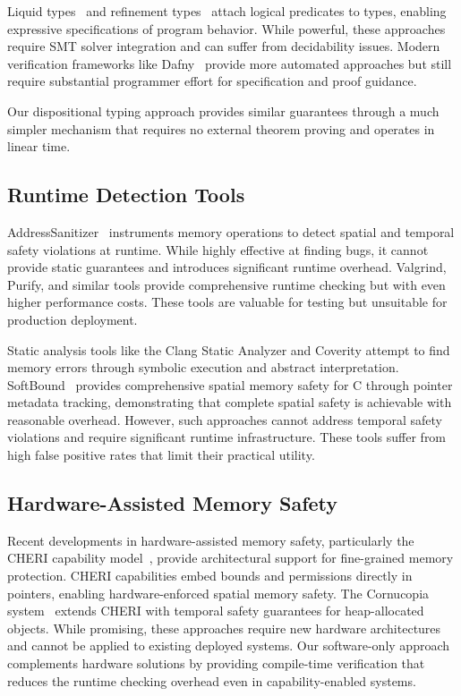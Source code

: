\documentclass[acmsmall,anonymous,review,screen]{acmart}
\begin{document}
	Liquid types~\cite{rondon2008liquid} and refinement types~\cite{vazou2014refinement} attach logical predicates to types, enabling expressive specifications of program behavior. While powerful, these approaches require SMT solver integration and can suffer from decidability issues. Modern verification frameworks like Dafny~\cite{leino2010dafny} provide more automated approaches but still require substantial programmer effort for specification and proof guidance.
	
	Our dispositional typing approach provides similar guarantees through a much simpler mechanism that requires no external theorem proving and operates in linear time.
	
	\subsection{Runtime Detection Tools}
	
	AddressSanitizer~\cite{serebryany2012addresssanitizer} instruments memory operations to detect spatial and temporal safety violations at runtime. While highly effective at finding bugs, it cannot provide static guarantees and introduces significant runtime overhead. Valgrind, Purify, and similar tools provide comprehensive runtime checking but with even higher performance costs. These tools are valuable for testing but unsuitable for production deployment. 
	
	Static analysis tools like the Clang Static Analyzer and Coverity attempt to find memory errors through symbolic execution and abstract interpretation. SoftBound~\cite{nagarakatte2009softbound} provides comprehensive spatial memory safety for C through pointer metadata tracking, demonstrating that complete spatial safety is achievable with reasonable overhead. However, such approaches cannot address temporal safety violations and require significant runtime infrastructure. These tools suffer from high false positive rates that limit their practical utility.
	
	\subsection{Hardware-Assisted Memory Safety}
	
	Recent developments in hardware-assisted memory safety, particularly the CHERI capability model~\cite{woodruff2014cheri}, provide architectural support for fine-grained memory protection. CHERI capabilities embed bounds and permissions directly in pointers, enabling hardware-enforced spatial memory safety. The Cornucopia system~\cite{filardo2020cornucopia} extends CHERI with temporal safety guarantees for heap-allocated objects. While promising, these approaches require new hardware architectures and cannot be applied to existing deployed systems. Our software-only approach complements hardware solutions by providing compile-time verification that reduces the runtime checking overhead even in capability-enabled systems.
	
\end{document}
